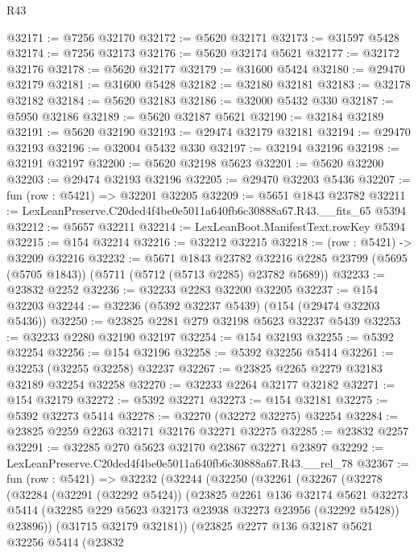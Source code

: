 \begin{lexlean}{R43}
\begin{coremodule}
@32171 := @7256 @32170
@32172 := @5620 @32171
@32173 := @31597 @5428
@32174 := @7256 @32173
@32176 := @5620 @32174 @5621
@32177 := @32172 @32176
@32178 := @5620 @32177
@32179 := @31600 @5424
@32180 := @29470 @32179
@32181 := @31600 @5428
@32182 := @32180 @32181
@32183 := @32178 @32182
@32184 := @5620 @32183
@32186 := @32000 @5432 @330
@32187 := @5950 @32186
@32189 := @5620 @32187 @5621
@32190 := @32184 @32189
@32191 := @5620 @32190
@32193 := @29474 @32179 @32181
@32194 := @29470 @32193
@32196 := @32004 @5432 @330
@32197 := @32194 @32196
@32198 := @32191 @32197
@32200 := @5620 @32198 @5623
@32201 := @5620 @32200
@32203 := @29474 @32193 @32196
@32205 := @29470 @32203 @5436
@32207 := fun (row : @5421) => @32201 @32205
@32209 := @5651 @1843 @23782
@32211 := LexLeanPreserve.C20ded4f4be0e5011a640fb6c30888a67.R43.__fits_65 @5394
@32212 := @5657 @32211
@32214 := LexLeanBoot.ManifestText.rowKey @5394
@32215 := @154 @32214
@32216 := @32212 @32215
@32218 := (row : @5421) -> @32209 @32216
@32232 := @5671
    @1843
    @23782
    @32216
    @2285
    @23799
    (@5695 (@5705 @1843))
    (@5711 (@5712 (@5713 @2285) @23782 @5689))
@32233 := @23832 @2252
@32236 := @32233 @2283 @32200 @32205
@32237 := @154 @32203
@32244 := @32236 (@5392 @32237 @5439) (@154 (@29474 @32203 @5436))
@32250 := @23825 @2281 @279 @32198 @5623 @32237 @5439
@32253 := @32233 @2280 @32190 @32197
@32254 := @154 @32193
@32255 := @5392 @32254
@32256 := @154 @32196
@32258 := @5392 @32256 @5414
@32261 := @32253 (@32255 @32258) @32237
@32267 := @23825 @2265 @2279 @32183 @32189 @32254 @32258
@32270 := @32233 @2264 @32177 @32182
@32271 := @154 @32179
@32272 := @5392 @32271
@32273 := @154 @32181
@32275 := @5392 @32273 @5414
@32278 := @32270 (@32272 @32275) @32254
@32284 := @23825 @2259 @2263 @32171 @32176 @32271 @32275
@32285 := @23832 @2257
@32291 := @32285 @270 @5623 @32170 @23867 @32271 @23897
@32292 := LexLeanPreserve.C20ded4f4be0e5011a640fb6c30888a67.R43.__rel_78
@32367 := fun (row : @5421) =>
  @32232
    (@32244
      (@32250
        (@32261
          (@32267
            (@32278
              (@32284
                (@32291 (@32292 @5424))
                (@23825
                  @2261
                  @136
                  @32174
                  @5621
                  @32273
                  @5414
                  (@32285 @229 @5623 @32173 @23938 @32273 @23956 (@32292 @5428))
                  @23896))
              (@31715 @32179 @32181))
            (@23825
              @2277
              @136
              @32187
              @5621
              @32256
              @5414
              (@23832

\end{coremodule}
\end{lexlean}

